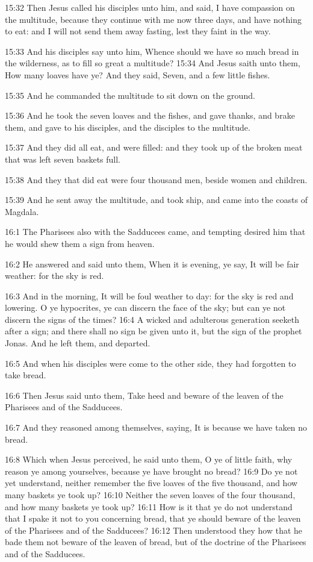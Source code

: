 15:32 Then Jesus called his disciples unto him, and said, I have
compassion on the multitude, because they continue with me now three
days, and have nothing to eat: and I will not send them away fasting,
lest they faint in the way.

15:33 And his disciples say unto him, Whence should we have so much
bread in the wilderness, as to fill so great a multitude?  15:34 And
Jesus saith unto them, How many loaves have ye? And they said, Seven,
and a few little fishes.

15:35 And he commanded the multitude to sit down on the ground.

15:36 And he took the seven loaves and the fishes, and gave thanks,
and brake them, and gave to his disciples, and the disciples to the
multitude.

15:37 And they did all eat, and were filled: and they took up of the
broken meat that was left seven baskets full.

15:38 And they that did eat were four thousand men, beside women and
children.

15:39 And he sent away the multitude, and took ship, and came into the
coasts of Magdala.

16:1 The Pharisees also with the Sadducees came, and tempting desired
him that he would shew them a sign from heaven.

16:2 He answered and said unto them, When it is evening, ye say, It
will be fair weather: for the sky is red.

16:3 And in the morning, It will be foul weather to day: for the sky
is red and lowering. O ye hypocrites, ye can discern the face of the
sky; but can ye not discern the signs of the times?  16:4 A wicked and
adulterous generation seeketh after a sign; and there shall no sign be
given unto it, but the sign of the prophet Jonas. And he left them,
and departed.

16:5 And when his disciples were come to the other side, they had
forgotten to take bread.

16:6 Then Jesus said unto them, Take heed and beware of the leaven of
the Pharisees and of the Sadducees.

16:7 And they reasoned among themselves, saying, It is because we have
taken no bread.

16:8 Which when Jesus perceived, he said unto them, O ye of little
faith, why reason ye among yourselves, because ye have brought no
bread?  16:9 Do ye not yet understand, neither remember the five
loaves of the five thousand, and how many baskets ye took up?  16:10
Neither the seven loaves of the four thousand, and how many baskets ye
took up?  16:11 How is it that ye do not understand that I spake it
not to you concerning bread, that ye should beware of the leaven of
the Pharisees and of the Sadducees?  16:12 Then understood they how
that he bade them not beware of the leaven of bread, but of the
doctrine of the Pharisees and of the Sadducees.

